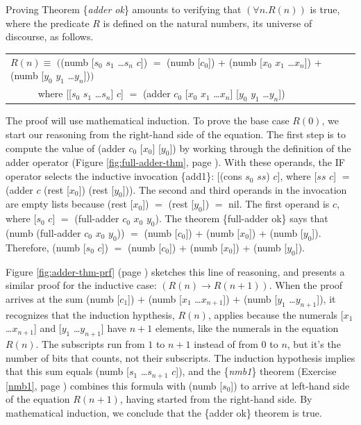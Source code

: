 Proving Theorem \{\emph{adder ok}\} amounts to
verifying that $(\forall n.R(n))$ is true,
where the predicate $R$ is defined on the natural numbers,
its universe of discourse, as follows.
\begin{center}
\begin{tabular}{l}
$R(n) \equiv$ $($(numb [$s_0$ $s_1$ \dots $s_{n}$ $c$]) $=$
(numb [$c_0$]) + (numb [$x_0$ $x_1$ \dots $x_{n}$]) + (numb [$y_0$ $y_1$ \dots $y_{n}$])$)$ \\
~~~~~ where [[$s_0$ $s_1$ \dots $s_{n}$] $c$] $=$ (adder $c_0$ [$x_0$ $x_1$ \dots $x_{n}$] [$y_0$ $y_1$ \dots $y_{n}$])\\
\end{tabular}
\end{center}

The proof will use mathematical induction.
To prove the base case $R(0)$,
we start our reasoning from the right-hand side of the equation.
The first step is
to compute the value of (adder $c_0$ [$x_0$] [$y_0$])
by working through the definition of the adder operator
(Figure \ref{fig:full-adder-thm}, page \pageref{fig:full-adder-thm}).
With these operands, the IF operator selects the inductive invocation \{add1\}:
[(cons $s_0$ $ss$) $c$], where [$ss$ $c$] $=$ (adder $c$ (rest [$x_0$]) (rest [$y_0$])).
The second and third operands in the invocation
are empty lists because (rest [$x_0$]) $=$ (rest [$y_0$]) $=$ nil.
The first operand is $c$, where [$s_0$ $c$] $=$ (full-adder $c_0$ $x_0$ $y_0$).
The theorem \{full-adder ok\} says that
(numb (full-adder $c_0$ $x_0$ $y_0$)) $=$ (numb [$c_0$]) + (numb [$x_0$]) + (numb [$y_0$]).
Therefore, (numb [$s_0$ $c$]) $=$ (numb [$c_0$]) + (numb [$x_0$]) + (numb [$y_0$]).

Figure \ref{fig:adder-thm-prf} (page \pageref{fig:adder-thm-prf}) sketches
this line of reasoning,
and presents a similar proof for the inductive case: $(R(n) \rightarrow R(n+1))$.
When the proof arrives at the sum
(numb [$c_1$]) $+$ (numb [$x_1$ \dots $x_{n+1}$]) $+$ (numb [$y_1$ \dots $y_{n+1}$]),
it recognizes that the induction hypthesis, $R(n)$, applies because
the numerals [$x_1$ \dots $x_{n+1}$] and [$y_1$ \dots $y_{n+1}$] have $n+1$
elements, like the numerals in the equation $R(n)$.
The subscripts run from $1$ to $n+1$ instead of from $0$ to $n$,
but it's the number of bits that counts, not their subscripts.
The induction hypothesis implies that this sum equals
(numb [$s_1$ \dots $s_{n+1}$ $c$]), and
the \{\emph{nmb1}\} theorem (Exercise \ref{nmb1}, page \pageref{nmb1})
combines this formula with (numb [$s_0$]) to arrive at left-hand side
of the equation $R(n+1)$, having started from the right-hand side.
By mathematical induction, we conclude that
the \{adder ok\} theorem is true.

